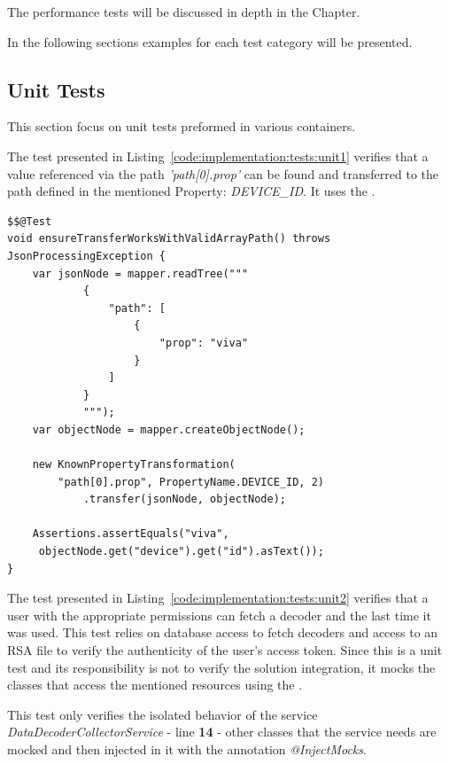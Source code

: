 The performance tests will be discussed in depth in the  Chapter.

In the following sections examples for each test category will be presented.

\subsection{Unit Tests}
\label{subsec:implementation:tests:unit}

This section focus on unit tests preformed in various containers.

The test presented in Listing~\ref{code:implementation:tests:unit1} verifies that a value referenced via the path \textit{'path[0].prop'} can be found and transferred to the path defined in the mentioned Property: \textit{DEVICE\_ID}. 
It uses the .

\begin{lstlisting}[style=Java, caption=Unit Test Example in \textit{iot-core} package, label={code:implementation:tests:unit1}]
$$@Test
void ensureTransferWorksWithValidArrayPath() throws JsonProcessingException {
    var jsonNode = mapper.readTree("""
            {
                "path": [
                    {
                        "prop": "viva"
                    }
                ]
            }
            """);
    var objectNode = mapper.createObjectNode();

    new KnownPropertyTransformation(
        "path[0].prop", PropertyName.DEVICE_ID, 2)
            .transfer(jsonNode, objectNode);

    Assertions.assertEquals("viva",
     objectNode.get("device").get("id").asText());
}
\end{lstlisting}

The test presented in Listing~\ref{code:implementation:tests:unit2} verifies that a user with the appropriate permissions can fetch a decoder and the last time it was used. This test relies on database access to fetch decoders and access to an RSA file to verify the authenticity of the user's access token. Since this is a unit test and its responsibility is not to verify the solution integration, it mocks the classes that access the mentioned resources using the .

This test only verifies the isolated behavior of the service \textit{DataDecoderCollectorService} - line \textbf{14} - other classes that the service needs are mocked and then injected in it with the annotation \textit{@InjectMocks}.


